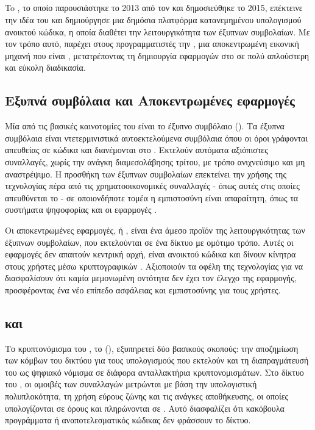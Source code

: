 \subsection{}
To , το οποίο παρουσιάστηκε το 2013 από τον  και δημοσιεύθηκε το 2015, επέκτεινε την ιδέα του  και δημιούργησε μια δημόσια πλατφόρμα κατανεμημένου υπολογισμού ανοικτού κώδικα, η οποία διαθέτει την λειτουργικότητα των έξυπνων συμβολαίων. Με τον τρόπο αυτό, παρέχει στους προγραμματιστές την , μια αποκεντρωμένη εικονική μηχανή που είναι , μετατρέποντας τη δημιουργία εφαρμογών στο  σε πολύ απλούστερη και εύκολη διαδικασία.

\subsection{Εξυπνά συμβόλαια και Aποκεντρωμένες εφαρμογές}
Μία από τις βασικές καινοτομίες του  είναι το έξυπνο συμβόλαιο (). Τα έξυπνα συμβόλαια είναι ντετερμινιστικά αυτοεκτελούμενα συμβόλαια όπου οι όροι γράφονται απευθείας σε κώδικα και διανέμονται στο . Εκτελούν αυτόματα αξιόπιστες συναλλαγές, χωρίς την ανάγκη διαμεσολάβησης τρίτου, με τρόπο ανιχνεύσιμο και μη αναστρέψιμο. Η προσθήκη των έξυπνων συμβολαίων επεκτείνει την χρήσης της τεχνολογίας  πέρα από τις χρηματοοικονομικές συναλλαγές - όπως αυτές στις οποίες απευθύνεται το  - σε οποιονδήποτε τομέα η εμπιστοσύνη είναι απαραίτητη, όπως τα συστήματα ψηφοφορίας και οι εφαρμογές .

Οι αποκεντρωμένες εφαρμογές, ή , είναι ένα άμεσο προϊόν της λειτουργικότητας των έξυπνων συμβολαίων, που εκτελούνται σε ένα δίκτυο  με ομότιμο τρόπο. Αυτές οι εφαρμογές δεν απαιτούν κεντρική αρχή, είναι ανοικτού κώδικα και δίνουν κίνητρα στους χρήστες μέσω κρυπτογραφικών . Αξιοποιούν τα οφέλη της τεχνολογίας  για να διασφαλίσουν ότι καμία μεμονωμένη οντότητα δεν έχει τον έλεγχο της εφαρμογής, προσφέροντας ένα νέο επίπεδο ασφάλειας και εμπιστοσύνης για τους χρήστες.

\subsection{ και }
Το κρυπτονόμισμα του , το  (), εξυπηρετεί δύο βασικούς σκοπούς: την αποζημίωση των κόμβων του δικτύου για τους υπολογισμούς που εκτελούν και τη διαπραγμάτευσή του ως ψηφιακό νόμισμα σε διάφορα ανταλλακτήρια κρυπτονομισμάτων. Στο δίκτυο του , οι αμοιβές των συναλλαγών μετρώνται με βάση την υπολογιστική πολυπλοκότητα, τη χρήση εύρους ζώνης και τις ανάγκες αποθήκευσης, οι οποίες υπολογίζονται σε όρους  και πληρώνονται σε . Αυτό διασφαλίζει ότι κακόβουλα προγράμματα ή αναποτελεσματικός κώδικας δεν φράσσουν το δίκτυο.

